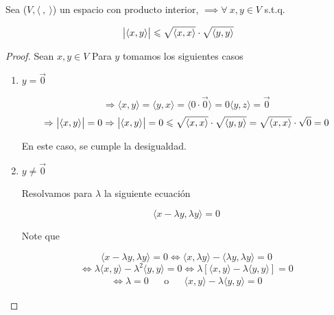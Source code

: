 \begin{theorem} \label{theom3}
    Sea ($V, \langle \: , \: \rangle$) un espacio con producto interior, $ \implies  \forall \: x,y \in V$ s.t.q.

    \begin{equation*}
        \abs{\langle x,y \rangle} \leqslant \sqrt{\langle x,x \rangle} \cdot \sqrt{\langle y,y \rangle}
    \end{equation*}
\end{theorem}

\begin{proof}
    Sean $x,y \in V$ Para $y$ tomamos los siguientes casos

    \begin{enumerate}
        \item $y=\vec{0}$

        \begin{equation*}
            \Rightarrow \langle x,y \rangle = \langle y,x \rangle = \langle 0 \cdot \vec{0} \rangle = 0 \langle y,z \rangle = \vec{0}
        \end{equation*}
        \begin{equation*}
            \Rightarrow \abs{\langle x,y \rangle} = 0 \Rightarrow \abs{\langle x,y \rangle} = 0 \leqslant \sqrt{\langle x,x \rangle} \cdot \sqrt{\langle y,y \rangle} = \sqrt{\langle x,x \rangle} \cdot \sqrt{0} = 0
        \end{equation*}

        En este caso, se cumple la desigualdad.
        \item $y \neq \vec{0}$

        Resolvamos para $\lambda$ la siguiente ecuación 

        \begin{equation*}
            \langle x - \lambda y , \lambda y \rangle = 0
        \end{equation*}
        
        Note que 

        \begin{equation*}
            \langle x - \lambda y , \lambda y \rangle = 0 \iff \langle x , \lambda y \rangle - \langle \lambda y , \lambda y \rangle = 0
        \end{equation*}
        \begin{equation*}
            \Leftrightarrow \lambda \langle x,y \rangle - \lambda^2 \langle y,y \rangle = 0 \iff \lambda [ \langle x,y \rangle - \lambda \langle y ,y \rangle ] = 0
        \end{equation*}
        \begin{align*}
            \iff \lambda = 0& & \text{o} & & \langle x,y \rangle - \lambda \langle y ,y \rangle = 0
        \end{align*}


\end{enumerate}
\end{proof}
